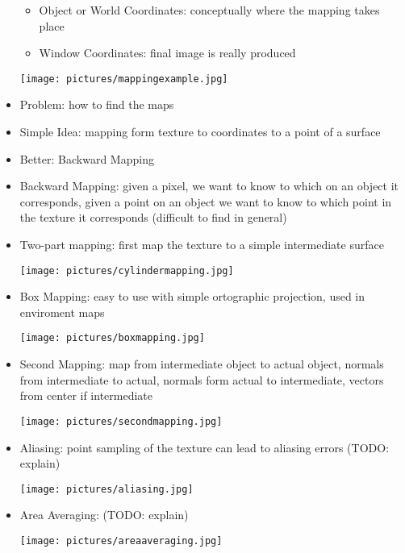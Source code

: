 \documentclass[11pt,a4paper]{article}
\begin{document}
\begin{itemize}
\begin{itemize}
				\item Object or World Coordinates: conceptually where the mapping takes place
				\item Window Coordinates: final image is really produced
			\end{itemize}
		\begin{center}
			\texttt{[image: pictures/mappingexample.jpg]}
		\end{center}
		\item Problem: how to find the maps
		\item Simple Idea: mapping form texture to coordinates to a point of a surface
		\item Better: Backward Mapping
		\item Backward Mapping: given a pixel, we want to know to which on an object it corresponds, given a point on an object we want to know to which point in the texture it corresponds (difficult to find in general)
		\item Two-part mapping: first map the texture to a simple intermediate surface
		\begin{center}
			\texttt{[image: pictures/cylindermapping.jpg]}
		\end{center}
		\item Box Mapping: easy to use with simple ortographic projection, used in enviroment maps
		\begin{center}
			\texttt{[image: pictures/boxmapping.jpg]}
		\end{center}
		\item Second Mapping: map from intermediate object to actual object, normals from intermediate to actual, normals form actual to intermediate, vectors from center if intermediate
		\begin{center}
			\texttt{[image: pictures/secondmapping.jpg]}
		\end{center}
		\item Aliasing: point sampling of the texture can lead to aliasing errors (TODO: explain)
		\begin{center}
			\texttt{[image: pictures/aliasing.jpg]}
		\end{center}
		\item Area Averaging: (TODO: explain)
		\begin{center}
			\texttt{[image: pictures/areaaveraging.jpg]}
		\end{center}
	\end{itemize}
\end{document}
